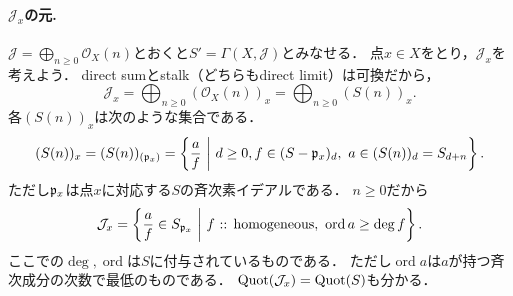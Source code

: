 \documentclass[a4paper]{jsarticle}
\newcommand{\shJ}{\mathcal{J}}
\newcommand{\shO}{\mathcal{O}}
\newcommand{\ord}{\operatorname{ord}}
\begin{document}
    \paragraph{$\shJ_x$の元.}
    $\shJ=\bigoplus_{n \geq 0} \shO_X(n)$とおくと$S'=\Gamma(X,\shJ)$とみなせる．
    点$x \in X$をとり，$\shJ_x$を考えよう．
    direct sumとstalk（どちらもdirect limit）は可換だから，
    \[ \shJ_x=\bigoplus_{n \geq 0} (\shO_X(n))_x=\bigoplus_{n \geq 0} (S(n))_x. \]
    各$(S(n))_x$は次のような集合である．
    \[
        (S(n))_x=
        (S(n))_{(\mathfrak{p}_x)}=
        \left\{ \frac{a}{f} ~\middle|~ d \geq 0, f \in (S-\mathfrak{p}_x)_d,~ a \in (S(n))_{d}=S_{d+n} \right\}.
    \]
    ただし$\mathfrak{p}_x$は点$x$に対応する$S$の斉次素イデアルである．
    $n \geq 0$だから
    \[ \shJ_x=\left\{ \frac{a}{f} \in S_{\I{p}_x}~\middle|~ f\text{ :: homogeneous},~ \ord a \geq \deg f \right\}. \]
    ここでの$\deg,\ord$は$S$に付与されているものである．
    ただし$\ord a$は$a$が持つ斉次成分の次数で最低のものである．
    $\Quot(\shJ_x)=\Quot(S)$も分かる．
\end{document}
